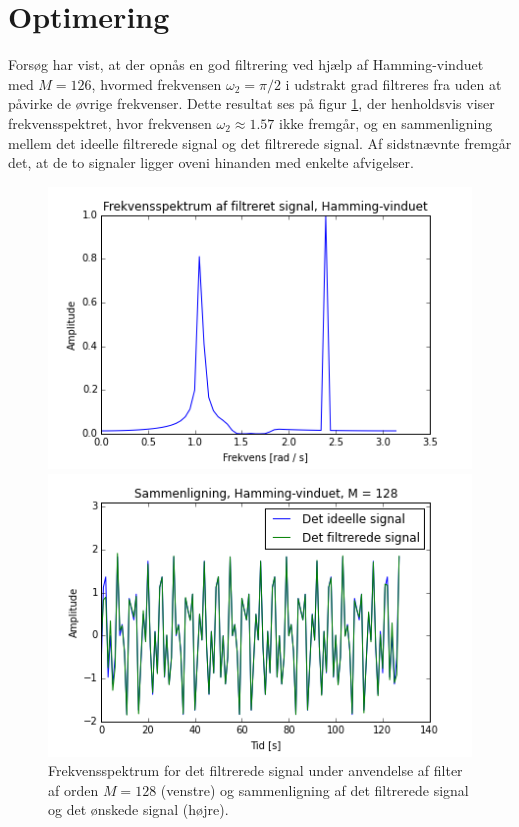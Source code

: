 \section{Optimering}
Forsøg har vist, at der opnås en god filtrering ved hjælp af Hamming-vinduet med $M=126$, hvormed frekvensen $\omega_2 = \pi/2$ i udstrakt grad filtreres fra uden at påvirke de øvrige frekvenser. Dette resultat ses på figur \ref{fig:resultat}, der henholdsvis viser frekvensspektret, hvor frekvensen $\omega_2 \approx 1.57$ ikke fremgår, og en sammenligning mellem det ideelle filtrerede signal og det filtrerede signal. Af sidstnævnte fremgår det, at de to signaler ligger oveni hinanden med enkelte afvigelser.
\begin{figure}[H]
\begin{minipage}{0.49\textwidth}
\centering
\includegraphics[width=\textwidth]{figures/Filter/freq_filt_signal_Hamming.png}
\end{minipage}
\begin{minipage}{0.49\textwidth}
\centering
\includegraphics[width=\textwidth]{figures/Filter/signal_compare_Hamming.png}
\end{minipage}
\caption{Frekvensspektrum for det filtrerede signal under anvendelse af filter af orden $M=128$ (venstre) og sammenligning af det filtrerede signal og det ønskede signal (højre).}
\label{fig:resultat}
\end{figure}

